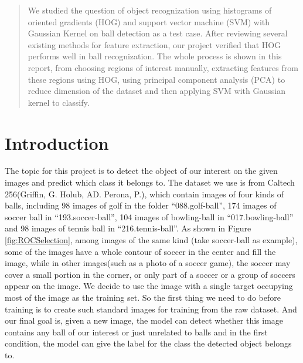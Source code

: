 \documentclass{article}
\begin{document}
 


\begin{abstract} 
We studied the question of object recognization using histograms of oriented gradients (HOG) and support vector machine (SVM) with Gaussian Kernel on ball detection as a test case. After reviewing several existing methods for feature extraction, our project verified that HOG performs well in ball recognization. The whole process is shown in this report, from choosing regions of interest manually, extracting features from these regions using HOG, using principal component analysis (PCA) to reduce dimension of the  dataset and then applying SVM with Gaussian kernel to classify.   
\end{abstract}


\section{Introduction}
The topic for this project is to detect the object of our interest on the given images and predict which class it belongs to. The dataset we use is from Caltech 256(Griffin, G. Holub, AD. Perona, P.), which contain images of four kinds of balls, including 98 images of golf in the folder ``088.golf-ball'', 174 images of soccer ball in ``193.soccer-ball'', 104 images of bowling-ball in ``017.bowling-ball'' and 98 images of tennis ball in ``216.tennis-ball''. As shown in Figure \ref{fig:ROCSelection}, among images of the same kind (take soccer-ball as example), some of the images have a whole contour of soccer in the center and fill the image, while in other images(such as a photo of a soccer game), the soccer may cover a small portion in the corner, or only part of a soccer or a group of soccers appear on the image. We decide to use the image with a single target occupying most of the image as the training set. So the first thing we need to do before training is to create such standard images for training from the raw dataset. And our final goal is, given a new image,  the model can detect whether this image contains any ball of our interest or just unrelated to balls and in the first condition, the model can give the label for the class the detected object belongs to.
\end{document}

